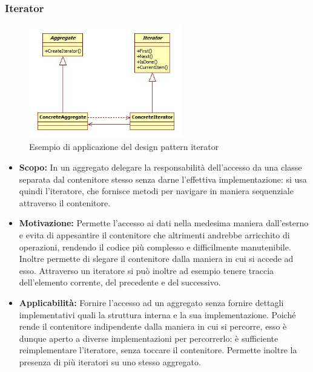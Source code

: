 \documentclass{scalatekids-article}
\begin{document}
\subsubsection{Iterator}
\begin{figure}[H]
  \begin{center}
    \includegraphics[width=0.6\textwidth, keepaspectratio]{img/designPattern/IteratorPattern.png}
    \caption{Esempio di applicazione del design pattern iterator}
  \end{center}
\end{figure}
\begin{itemize}
\item \textbf{Scopo:} In un aggregato delegare la responsabilità dell'accesso da una classe separata dal contenitore stesso senza darne l'effettiva implementazione: si usa quindi l'iteratore, che fornisce metodi per navigare in maniera sequenziale attraverso il contenitore.
\item \textbf{Motivazione:} Permette l'accesso ai dati nella medesima maniera dall'esterno e evita di appesantire il contenitore che altrimenti andrebbe arricchito di operazioni, rendendo il codice più complesso e difficilmente manutenibile. Inoltre permette di slegare il contenitore dalla maniera in cui si accede ad esso. Attraverso un iteratore si può inoltre ad esempio tenere traccia dell'elemento corrente, del precedente e del successivo.
\item \textbf{Applicabilità:} Fornire l'accesso ad un aggregato senza fornire dettagli implementativi quali la struttura interna e la sua implementazione. Poiché rende  il contenitore indipendente dalla maniera in cui si percorre, esso è dunque aperto a diverse implementazioni per percorrerlo: è sufficiente reimplementare l'iteratore, senza toccare il contenitore. Permette inoltre la presenza di più iteratori su uno stesso aggregato.
\end{itemize}
\end{document}
